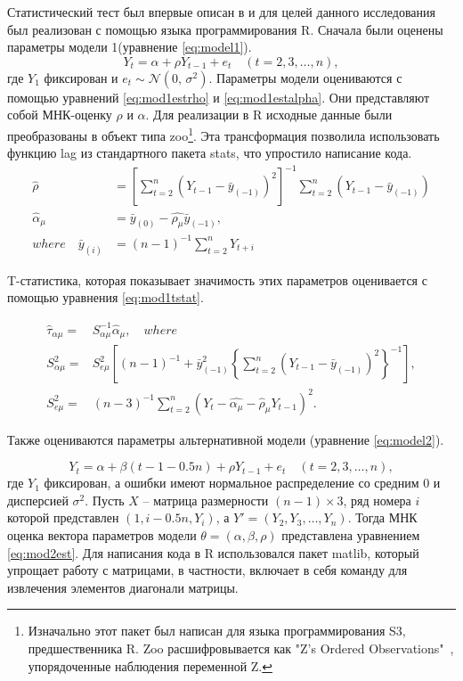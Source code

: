 \documentclass[a4paper,12pt]{article}
\begin{document}
Статистический тест был впервые описан в \cite{Dickey1981} и для целей данного исследования был реализован с помощью языка программирования R. Сначала были оценены параметры модели 1(уравнение \ref{eq:model1}).
\begin{equation}
  Y_t=\alpha+\rho Y_{t-1}+e_t\quad (t=2,3,\ldots,n),
\label{eq:model1}
\end{equation}
где $Y_1$ фиксирован и $e_t \sim \mathcal{N}(0,\,\sigma^{2})$. Параметры модели оцениваются с помощью уравнений \ref{eq:mod1estrho} и \ref{eq:mod1estalpha}. Они представляют собой МНК-оценку $\rho$ и $\alpha$. Для реализации в R исходные данные были преобразованы в объект типа zoo\footnote{Изначально этот пакет был написан для языка программирования S3, предшественника R. Zoo расшифровывается как "Z's Ordered Observations"\ , упорядоченные наблюдения переменной Z.}. Эта трансформация позволила использовать функцию lag из стандартного пакета stats, что упростило написание кода.
\begin{align}
  \label{eq:mod1estrho}
  \hat{\rho}&=\left[\sum_{t=2}^n (Y_{t-1}-\bar{y}_{(-1)})^2\right]^{-1}
  \sum_{t=2}^n \left(Y_{t-1}-\bar{y}_{(-1)}\right)\\
  \label{eq:mod1estalpha}
  \hat{\alpha}_\mu&=\bar{y}_{(0)}-\hat{\rho_\mu}\bar{y}_{(-1)},\\
where\quad
  \bar{y}_{(i)}&=(n-1)^{-1}\sum_{t=2}^{n}Y_{t+i}
\end{align}

T-статистика, которая показывает значимость этих параметров оценивается с помощью уравнения \ref{eq:mod1tstat}.

\begin{align}
  \label{eq:mod1tstat}
  \hat{\tau}_{\alpha\mu}=&S^{-1}_{\alpha\mu}\hat{\alpha}_\mu,\quad
  where\\
  S^2_{\alpha\mu}=&S^2_{e\mu}
  \left[ (n-1)^{-1}+\bar{y}^2_{(-1)}
  \left\{
  \sum_{t=2}^{n}(Y_{t-1}-\bar{y}_{(-1)})^2\right\}^{-1}\right],\\
  S^2_{e\mu}=&(n-3)^{-1}\sum_{t=2}^{n}(Y_t-\hat{\alpha_\mu}-\hat{\rho}_\mu Y_{t-1})^2.
\end{align}

Также оцениваются параметры альтернативной модели (уравнение \ref{eq:model2}).

\begin{equation}
  \label{eq:model2}
  Y_t=\alpha+\beta(t-1-0.5n)+\rho Y_{t-1}+e_t\quad (t=2,3,\ldots,n),
\end{equation}
где $Y_1$ фиксирован, а ошибки имеют нормальное распределение со средним 0 и дисперсией $\sigma^2$. Пусть $X$ -- матрица размерности $(n-1)\times 3$, ряд номера $i$ которой представлен $(1, i-0.5n, Y_i)$, а $Y'=(Y_2,Y_3,\ldots,Y_n)$. Тогда МНК оценка вектора параметров модели $\theta=(\alpha,\beta,\rho)$ представлена уравнением \ref{eq:mod2est}. Для написания кода в R использовался пакет matlib, который упрощает работу с матрицами, в частности, включает в себя команду для извлечения элементов диагонали матрицы.
\end{document}
